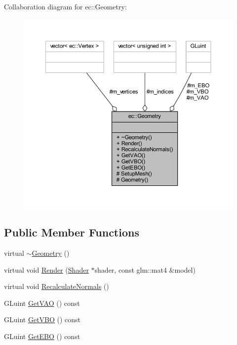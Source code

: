 Collaboration diagram for ec\+:\+:Geometry\+:
\nopagebreak
\begin{figure}[H]
\begin{center}
\leavevmode
\includegraphics[width=350pt]{classec_1_1_geometry__coll__graph}
\end{center}
\end{figure}
\subsection*{Public Member Functions}
\begin{DoxyCompactItemize}
\item 
virtual \mbox{\hyperlink{classec_1_1_geometry_a964c581313da2be51a3c78d3be7f48b3}{$\sim$\+Geometry}} ()
\item 
virtual void \mbox{\hyperlink{classec_1_1_geometry_a8de70c6fd7391ec0555b2df57912b177}{Render}} (\mbox{\hyperlink{classec_1_1_shader}{Shader}} $\ast$shader, const glm\+::mat4 \&model)
\item 
virtual void \mbox{\hyperlink{classec_1_1_geometry_a660f620c773555a6f9b4f2ad38384450}{Recalculate\+Normals}} ()
\item 
G\+Luint \mbox{\hyperlink{classec_1_1_geometry_a904043350205cd33d95a4242a32bb2f4}{Get\+V\+AO}} () const
\item 
G\+Luint \mbox{\hyperlink{classec_1_1_geometry_a4c97679ded851fbcfd82c4dc9a7c9911}{Get\+V\+BO}} () const
\item 
G\+Luint \mbox{\hyperlink{classec_1_1_geometry_a5a4267fdce08b8b71a7cd7956b865064}{Get\+E\+BO}} () const
\end{DoxyCompactItemize}
